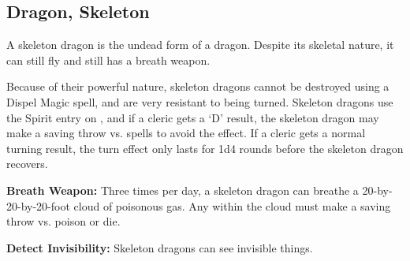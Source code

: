 \begin{multicols*}{2}

\subsection{Dragon, Skeleton}

A skeleton dragon is the undead form of a dragon. Despite its skeletal nature, it can still fly and still has a breath weapon.

Because of their powerful nature, skeleton dragons cannot be destroyed using a Dispel Magic spell, and are very resistant to being turned. Skeleton dragons use the Spirit entry on , and if a cleric gets a ‘D’ result, the skeleton dragon may make a saving throw vs. spells to avoid the effect. If a cleric gets a normal turning result, the turn effect only lasts for 1d4 rounds before the skeleton dragon recovers.

\textbf{Breath Weapon:} Three times per day, a skeleton dragon can breathe a 20-by-20-by-20-foot cloud of poisonous gas. Any within the cloud must make a saving throw vs. poison or die.

\textbf{Detect Invisibility:} Skeleton dragons can see invisible things.


\end{multicols*}
